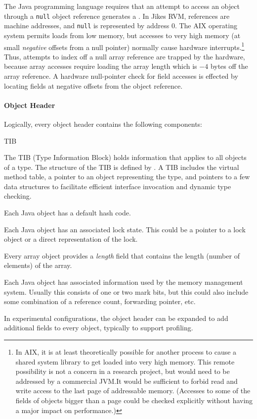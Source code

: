 The Java programming language requires that an attempt to access an
object through a {\tt null} 
object reference generates a .
In Jikes RVM, references
are machine addresses, and {\tt null} is represented by address $0$.
The AIX\TMweb{} operating system permits loads from low memory,
but accesses 
to very high memory (at small {\em negative} offsets from a null
pointer) normally cause hardware interrupts.\footnote{In AIX, it is at
least theoretically possible for another process to cause a shared
system library to get loaded into very high memory.  This remote
possibility is not a concern in a research project, but would need to
be addressed by a commercial JVM.\@  It would be sufficient to forbid
read and write access to the last page of addressable memory.
(Accesses to some of the fields of objects bigger than a page could be
checked explicitly without having a major impact on performance.)}
Thus, attempts to index off a null array reference are trapped by
the hardware, because array accesses require loading the array length
which is $-4$ bytes off the array reference.  A hardware null-pointer
check for field accesses is effected by locating fields at negative
offsets from the object reference.

\paragraph{Object Header}
Logically, every object header contains the following components:
\begin{description}
%
\begin{Label}{TIB}
\item[TIB Pointer] The TIB (Type Information Block) holds information that
applies to all objects of a type.  The structure of the TIB is defined by 
.
A TIB includes the virtual method table, a pointer to an object
representing the type, and pointers to a few data structures to
facilitate efficient interface invocation and dynamic type checking.
\end{Label}
%
\item[Default Hash Code] Each Java object has a default hash code.
%
\item[Lock] Each Java object has an associated lock state.  This could be a
pointer to a lock object or a direct representation of the lock.
%
\item[Array Length] Every array object provides a {\em length} field
that contains the length (number of elements) of the array.
%
\item[Garbage Collection Information] Each Java object has associated
information used by the memory management system.  Usually this consists of one
or two mark bits, but this could also include some combination of a reference
count, forwarding pointer, etc.
%
\item[Misc Fields] In experimental configurations, the object header
can be expanded to add additional fields to every object, typically to
support profiling. 
\end{description}

